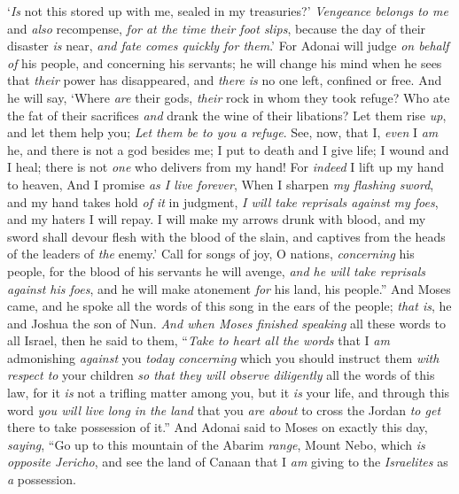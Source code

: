 \begin{biblechapter}
\verse ‘\textit{Is} not this stored up with me, 
sealed in my treasuries?’
\verse \textit{Vengeance belongs to me} and \textit{also} recompense, 
\textit{for at the time their foot slips}, 
because the day of their disaster \textit{is} near, 
\textit{and fate comes quickly for them}.’
\verse For Adonai will judge \textit{on behalf of} his people, 
and concerning his servants; 
he will change his mind when he sees that \textit{their} power has disappeared, 
and \textit{there is} no one left, confined or free.
\verse And he will say, ‘Where \textit{are} their gods, 
\textit{their} rock in whom they took refuge?
\verse Who ate the fat of their sacrifices 
\textit{and} drank the wine of their libations? 
Let them rise \textit{up}, and let them help you; 
\textit{Let them be to you a refuge}.
\verse See, now, that I, \textit{even} I \textit{am} he, 
and there is not a god besides me; 
I put to death and I give life; 
I wound and I heal; 
there is not \textit{one} who delivers from my hand!
\verse For \textit{indeed} I lift up my hand to heaven, 
And I promise \textit{as I live forever},
\verse When I sharpen \textit{my flashing sword}, 
and my hand takes hold \textit{of it} in judgment, 
\textit{I will take reprisals against my foes}, 
and my haters I will repay.
\verse I will make my arrows drunk with blood, 
and my sword shall devour flesh with the blood of the slain, 
and captives from the heads of the leaders of \textit{the} enemy.’
\verse Call for songs of joy, O nations, \textit{concerning} his people, 
for the blood of his servants he will avenge, 
\textit{and he will take reprisals against his foes}, 
and he will make atonement \textit{for} his land, his people.”
\verse And Moses came, and he spoke all the words of this song in the ears of the people; \textit{that is}, he and Joshua the son of Nun.
\verse \textit{And when Moses finished speaking} all these words to all Israel,
\verse then he said to them, “\textit{Take to heart all the words} that I \textit{am} admonishing \textit{against} you \textit{today} \textit{concerning} which you should instruct them \textit{with respect to} your children \textit{so that they will observe diligently} all the words of this law,
\verse for it \textit{is} not a trifling matter among you, but it \textit{is} your life, and through this word \textit{you will live long in the land} that you \textit{are about} to cross the Jordan \textit{to get} there to take possession of it.”
 And Adonai said to Moses on exactly this day, \textit{saying},
\verse “Go up to this mountain of the Abarim \textit{range}, Mount Nebo, which \textit{is} \textit{opposite Jericho}, and see the land of Canaan that I \textit{am} giving to the \textit{Israelites} as \textit{a} possession.

\end{biblechapter}

